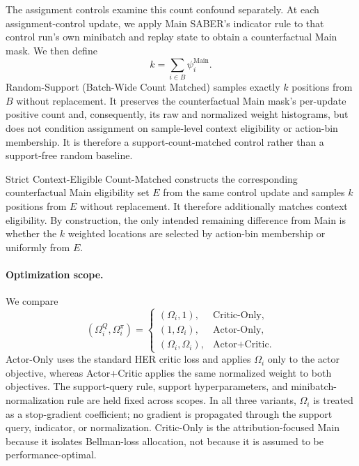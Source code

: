 \documentclass[letterpaper]{article}
\begin{document}
The assignment controls examine this count confound separately. At each assignment-control update, we apply Main SABER's indicator rule to that control run's own minibatch and replay state to obtain a counterfactual Main mask. We then define
\begin{equation}
k=\sum_{i\in B}\psi_i^{\mathrm{Main}}.
\end{equation}
Random-Support (Batch-Wide Count Matched) samples exactly \(k\) positions from \(B\) without replacement. It preserves the counterfactual Main mask's per-update positive count and, consequently, its raw and normalized weight histograms, but does not condition assignment on sample-level context eligibility or action-bin membership. It is therefore a support-count-matched control rather than a support-free random baseline.

Strict Context-Eligible Count-Matched constructs the corresponding counterfactual Main eligibility set \(E\) from the same control update and samples \(k\) positions from \(E\) without replacement. It therefore additionally matches context eligibility. By construction, the only intended remaining difference from Main is whether the \(k\) weighted locations are selected by action-bin membership or uniformly from \(E\).

\paragraph{Optimization scope.}
We compare
\begin{equation}
(\Omega_i^Q,\Omega_i^\pi)=
\begin{cases}
(\Omega_i,1), & \text{Critic-Only},\\
(1,\Omega_i), & \text{Actor-Only},\\
(\Omega_i,\Omega_i), & \text{Actor+Critic}.
\end{cases}
\end{equation}
Actor-Only uses the standard HER critic loss and applies \(\Omega_i\) only to the actor objective, whereas Actor+Critic applies the same normalized weight to both objectives. The support-query rule, support hyperparameters, and minibatch-normalization rule are held fixed across scopes. In all three variants, \(\Omega_i\) is treated as a stop-gradient coefficient; no gradient is propagated through the support query, indicator, or normalization. Critic-Only is the attribution-focused Main because it isolates Bellman-loss allocation, not because it is assumed to be performance-optimal.
\end{document}
